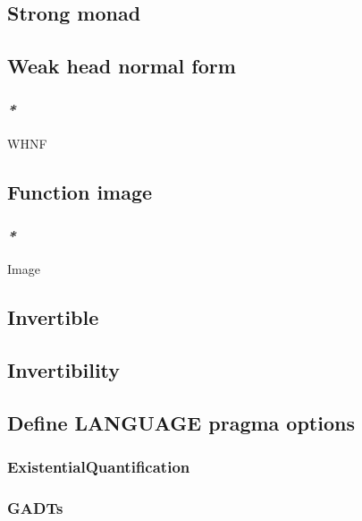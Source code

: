 \documentclass[11pt]{article}
\begin{document}
\subsection{\label{org95393ee}Strong monad}
\label{sec:org2070de4}

\subsection{\label{orgda9ab65}Weak head normal form}
\label{sec:orgde34758}

\subsubsection{\emph{*}}
\label{sec:orga4c7012}

\label{orge725403}WHNF\\

\subsection{\label{org7a15735}Function image}
\label{sec:org1939aab}

\subsubsection{\emph{*}}
\label{sec:org15f69cc}

\label{orgef20814}Image\\

\subsection{\label{org1df998c}Invertible}
\label{sec:orgd520b97}
\subsection{\label{orgd0b4eaa}Invertibility}
\label{sec:orge3e7889}
\subsection{\label{org4127c46}Define LANGUAGE pragma options}
\label{sec:org032363b}

\subsubsection{\label{org63de444}ExistentialQuantification}
\label{sec:orgf709095}

\subsubsection{\label{org7f1cfa8}GADTs}
\label{sec:orgfe23108}
\end{document}

